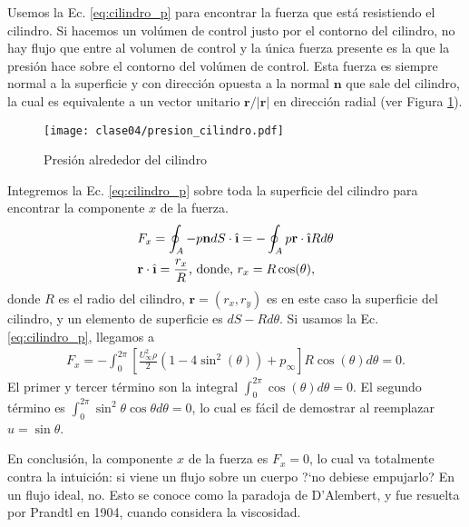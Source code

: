 Usemos la Ec. \eqref{eq:cilindro_p} para encontrar la fuerza que está resistiendo el cilindro.
Si hacemos un volúmen de control justo por el contorno del cilindro, no hay flujo que entre al volumen de control y la única fuerza presente es la que la presión hace sobre el contorno del volúmen de control.
Esta fuerza es siempre normal a la superficie y con dirección opuesta a la normal $\mathbf{n}$ que sale del cilindro, la cual es equivalente a un vector unitario $\mathbf{r}/|\mathbf{r}|$ en dirección radial (ver Figura \ref{fig:presion_cilindro}).
%
\begin{figure}[h!]
\centering
\texttt{[image: clase04/presion\_cilindro.pdf]}
\caption{Presión alrededor del cilindro}
\label{fig:presion_cilindro}
\end{figure}

Integremos la Ec. \eqref{eq:cilindro_p} sobre toda la superficie del cilindro para encontrar la componente $x$ de la fuerza.
%
\begin{align}\label{eq:fuerza_x}
&F_x = \oint_A -p\mathbf{n}dS\cdot\ihat = -\oint_A p\mathbf{r}\cdot\ihat Rd\theta \nonumber\\
&\mathbf{r}\cdot\ihat =\frac{r_x}{R} \text{, donde, } r_x = R\cos(\theta),
\end{align}
%
donde $R$ es el radio del cilindro, $\mathbf{r}=(r_x,r_y)$ es en este caso la superficie del cilindro, y un elemento de superficie es $dS-Rd\theta$.
Si usamos la Ec. \eqref{eq:cilindro_p}, llegamos a
%
\begin{align}
F_x = -\int_0^{2\pi}\left[\frac{U_\infty^2\rho}{2}(1-4\sin^2(\theta))+p_\infty\right]R\cos(\theta)d\theta=0.
\end{align}
El primer y tercer término son la integral $\int_0^{2\pi}\cos(\theta)d\theta=0$.
El segundo término es $\int_0^{2\pi}\sin^2\theta\cos\theta d\theta=0$, lo cual es fácil de demostrar al reemplazar $u=\sin\theta$.

En conclusión, la componente $x$ de la fuerza es $F_x=0$, lo cual va totalmente contra la intuición: si viene un flujo sobre un cuerpo \mbox{?`}no debiese empujarlo? En un flujo ideal, no.
Esto se conoce como la paradoja de D'Alembert, y fue resuelta por Prandtl en 1904, cuando considera la viscosidad. 

